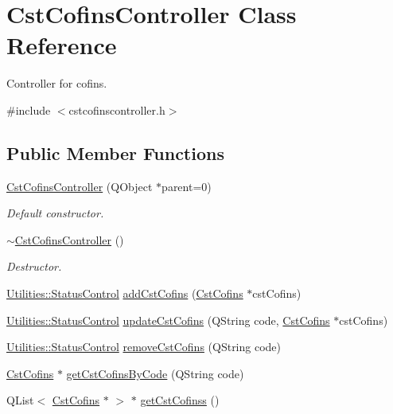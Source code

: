 \hypertarget{class_cst_cofins_controller}{\section{\-Cst\-Cofins\-Controller \-Class \-Reference}
\label{class_cst_cofins_controller}
}


\-Controller for cofins.  




{\ttfamily \#include $<$cstcofinscontroller.\-h$>$}

\subsection*{\-Public \-Member \-Functions}
\begin{DoxyCompactItemize}
\item 
\hyperlink{class_cst_cofins_controller_a723c892bdc77679d755b037aad04ee66}{\-Cst\-Cofins\-Controller} (\-Q\-Object $\ast$parent=0)
\begin{DoxyCompactList}\small\item\em \-Default constructor. \end{DoxyCompactList}\item 
\hyperlink{class_cst_cofins_controller_a2a1133d63528c3ab71f2ce653ba8aa07}{$\sim$\-Cst\-Cofins\-Controller} ()
\begin{DoxyCompactList}\small\item\em \-Destructor. \end{DoxyCompactList}\item 
\hyperlink{class_utilities_a2974f062d85bdb0c444a1cbe554bf228}{\-Utilities\-::\-Status\-Control} \hyperlink{class_cst_cofins_controller_acbde8690ef336c4661bb8e360b6da4e9}{add\-Cst\-Cofins} (\hyperlink{class_cst_cofins}{\-Cst\-Cofins} $\ast$cst\-Cofins)
\item 
\hyperlink{class_utilities_a2974f062d85bdb0c444a1cbe554bf228}{\-Utilities\-::\-Status\-Control} \hyperlink{class_cst_cofins_controller_a91b905a71d0f108b6467efabc9f44f4c}{update\-Cst\-Cofins} (\-Q\-String code, \hyperlink{class_cst_cofins}{\-Cst\-Cofins} $\ast$cst\-Cofins)
\item 
\hyperlink{class_utilities_a2974f062d85bdb0c444a1cbe554bf228}{\-Utilities\-::\-Status\-Control} \hyperlink{class_cst_cofins_controller_a906449ac2f9d572134de8393d75450fe}{remove\-Cst\-Cofins} (\-Q\-String code)
\item 
\hyperlink{class_cst_cofins}{\-Cst\-Cofins} $\ast$ \hyperlink{class_cst_cofins_controller_ad1aa8fc8029e78ef875abd0c472008fd}{get\-Cst\-Cofins\-By\-Code} (\-Q\-String code)
\item 
\-Q\-List$<$ \hyperlink{class_cst_cofins}{\-Cst\-Cofins} $\ast$ $>$ $\ast$ \hyperlink{class_cst_cofins_controller_adec50ea27f35ed333518c91cd06f7cce}{get\-Cst\-Cofinss} ()
\end{DoxyCompactItemize}



